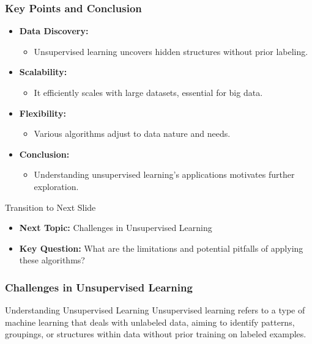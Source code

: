 \documentclass[aspectratio=169]{beamer}
\begin{document}
\begin{frame}[fragile]
    \frametitle{Key Points and Conclusion}
    \begin{itemize}
        \item \textbf{Data Discovery:} 
            \begin{itemize}
                \item Unsupervised learning uncovers hidden structures without prior labeling.
            \end{itemize}
        \item \textbf{Scalability:} 
            \begin{itemize}
                \item It efficiently scales with large datasets, essential for big data.
            \end{itemize}
        \item \textbf{Flexibility:} 
            \begin{itemize}
                \item Various algorithms adjust to data nature and needs.
            \end{itemize}
        \item \textbf{Conclusion:} 
            \begin{itemize}
                \item Understanding unsupervised learning's applications motivates further exploration.
            \end{itemize}
    \end{itemize}
    
    \begin{block}{Transition to Next Slide}
        \begin{itemize}
            \item \textbf{Next Topic:} Challenges in Unsupervised Learning
            \item \textbf{Key Question:} What are the limitations and potential pitfalls of applying these algorithms?
        \end{itemize}
    \end{block}
\end{frame}

\begin{frame}[fragile]
    \frametitle{Challenges in Unsupervised Learning}
    \begin{block}{Understanding Unsupervised Learning}
        Unsupervised learning refers to a type of machine learning that deals with unlabeled data, aiming to identify patterns, groupings, or structures within data without prior training on labeled examples.
    \end{block}
\end{frame}
\end{document}
